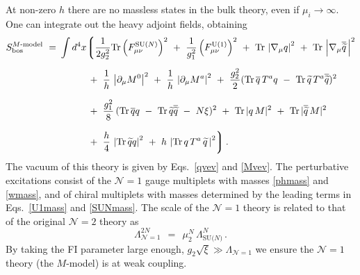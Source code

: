 \documentclass[12pt]{article}
\def\beq{\begin{equation}}
\def\eeq{\end{equation}}
\def\Tr{{\rm Tr}}
\newcommand{\ntwo}{${\mathcal N}=2$ }
\newcommand{\none}{${\mathcal N}=1$ }
\newcommand{\p}{\partial}
\newcommand{\wt}{\widetilde}
\newcommand{\ov}{\overline}
\newcommand{\mc}[1]{\mathcal{#1}}
\begin{document}
	At non-zero $ h $ there are no massless states in the bulk theory, even
	if $ \mu_i \to \infty $.
	One can integrate out the heavy adjoint fields, obtaining
\begin{align}
\label{mmodel}
%
\notag
	S_{\rm bos}^\text{$M$-model} ~=~ & \int d^4 x 
		\biggl\lgroup
			\frac{1}{2g_2^2}\Tr \left(F_{\mu\nu}^\text{SU($N$)}\right)^2  ~+~
			\frac{1}{g_1^2} \left(F_{\mu\nu}^{\rm U(1)}\right)^2 ~+~ 
			\Tr\, \left| \nabla_\mu q \right|^2 ~+~ \Tr\,\left|\nabla_\mu \ov{\wt{q}}\, \right|^2 
			\\[2mm]
%
		&
\notag
			\phantom{\int d^4 x}
			~+~
			\frac{1}{h}\, \left| \p_\mu M^0 \right|^2  ~+~
			\frac{1}{h}\, \left| \p_\mu M^a \right|^2 ~+~
			\frac{g_2^2}{2} ( \Tr\, \ov{q}\, T^a q 
					~-~ \Tr\, \wt{q}\, T^a \ov{\wt{q}} )^2 
			\\[2mm]
%
\notag
		&
			\phantom{\int d^4 x}
			~+~
			\frac{g_1^2}{8}\, (\Tr\, \ov{q} q ~-~ \Tr\, \wt{q} \ov{\wt{q}} ~-~ N\xi )^2
			~+~
			\Tr\, |q\,M|^2 ~+~ \Tr\, |\ov{\wt{q}}\, M |^2
			\\[2mm]
%
		&
			\phantom{\int d^4 x}
			~+~
			\frac{h}{4}\, \left| \Tr\, \wt{q}q \right|^2  ~+~ 
			h\,\left| \Tr\, q\,T^a\,\wt{q} \,\right|^2
			\biggr\rgroup\,.	
\end{align}
	The vacuum of this theory is given by Eqs.~\eqref{qvev} and \eqref{Mvev}.
	The perturbative excitations consist of the \none gauge multiplets with masses
	\eqref{phmass} and \eqref{wmass}, and of chiral multiplets with masses determined by the 
	leading terms in Eqs.~\eqref{U1mass} and \eqref{SUNmass}.
	The scale of the \none theory is related to that of the original \ntwo theory as
\beq
	\Lambda_{\mc{N}=1}^{2N} ~~=~~ \mu_2^N\, \Lambda^N_\text{SU($N$)}\,.
\label{Lambda}
\eeq
	By taking the FI parameter large enough, 
	$ g_2\sqrt{\xi} \gg \Lambda_{\mc{N}=1} $
	we ensure the \none theory (the $M$-model) is at
	weak coupling.
	
\end{document}
